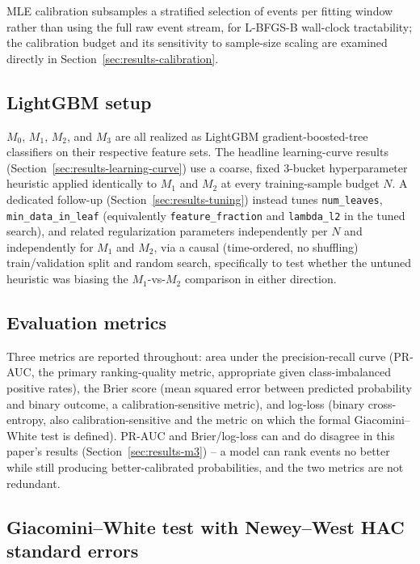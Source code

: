 MLE calibration subsamples a stratified selection of events per fitting
window rather than using the full raw event stream, for L-BFGS-B
wall-clock tractability; the calibration budget and its sensitivity to
sample-size scaling are examined directly in
Section~\ref{sec:results-calibration}.

\subsection{LightGBM setup}
\label{sec:methodology-lgbm}

$M_0$, $M_1$, $M_2$, and $M_3$ are all realized as LightGBM
gradient-boosted-tree classifiers on their respective feature sets. The
headline learning-curve results
(Section~\ref{sec:results-learning-curve}) use a coarse, fixed
3-bucket hyperparameter heuristic applied identically to $M_1$ and $M_2$
at every training-sample budget $N$. A dedicated follow-up
(Section~\ref{sec:results-tuning}) instead tunes \texttt{num\_leaves},
\texttt{min\_data\_in\_leaf} (equivalently \texttt{feature\_fraction} and
\texttt{lambda\_l2} in the tuned search), and related regularization
parameters independently per $N$ and independently for $M_1$ and $M_2$,
via a causal (time-ordered, no shuffling) train/validation split and
random search, specifically to test whether the untuned heuristic was
biasing the $M_1$-vs-$M_2$ comparison in either direction.

\subsection{Evaluation metrics}
\label{sec:methodology-metrics}

Three metrics are reported throughout: area under the precision-recall
curve (PR-AUC, the primary ranking-quality metric, appropriate given
class-imbalanced positive rates), the Brier score (mean squared error
between predicted probability and binary outcome, a calibration-sensitive
metric), and log-loss (binary cross-entropy, also calibration-sensitive
and the metric on which the formal Giacomini--White test is defined).
PR-AUC and Brier/log-loss can and do disagree in this paper's results
(Section~\ref{sec:results-m3}) -- a model can rank events no better while
still producing better-calibrated probabilities, and the two metrics are
not redundant.

\subsection{Giacomini--White test with Newey--West HAC standard errors}
\label{sec:methodology-gw}

